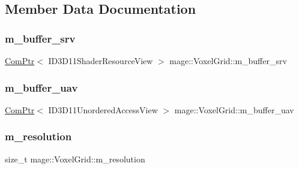 \subsection{Member Data Documentation}
\hypertarget{classmage_1_1_voxel_grid_a085ef56558b149e65f41ddf999eeb5cb}{}\label{classmage_1_1_voxel_grid_a085ef56558b149e65f41ddf999eeb5cb} 
\subsubsection{\texorpdfstring{m\+\_\+buffer\+\_\+srv}{m\_buffer\_srv}}
{\footnotesize\ttfamily \hyperlink{namespacemage_ae74f374780900893caa5555d1031fd79}{Com\+Ptr}$<$ I\+D3\+D11\+Shader\+Resource\+View $>$ mage\+::\+Voxel\+Grid\+::m\+\_\+buffer\+\_\+srv\hspace{0.3cm}{\ttfamily [private]}}

\hypertarget{classmage_1_1_voxel_grid_ab280f80bc83e55e762bb19dec30ed37f}{}\label{classmage_1_1_voxel_grid_ab280f80bc83e55e762bb19dec30ed37f} 
\subsubsection{\texorpdfstring{m\+\_\+buffer\+\_\+uav}{m\_buffer\_uav}}
{\footnotesize\ttfamily \hyperlink{namespacemage_ae74f374780900893caa5555d1031fd79}{Com\+Ptr}$<$ I\+D3\+D11\+Unordered\+Access\+View $>$ mage\+::\+Voxel\+Grid\+::m\+\_\+buffer\+\_\+uav\hspace{0.3cm}{\ttfamily [private]}}

\hypertarget{classmage_1_1_voxel_grid_ab7d1b3d265db5f26f73dd4d7fad106a6}{}\label{classmage_1_1_voxel_grid_ab7d1b3d265db5f26f73dd4d7fad106a6} 
\subsubsection{\texorpdfstring{m\+\_\+resolution}{m\_resolution}}
{\footnotesize\ttfamily size\+\_\+t mage\+::\+Voxel\+Grid\+::m\+\_\+resolution\hspace{0.3cm}{\ttfamily [private]}}

